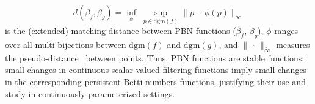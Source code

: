 \begin{equation*}\label{eq:pbn_stability}
	d(\beta_f, \beta_g) = \inf\limits_{\phi} \; \sup\limits_{p \in \mathrm{dgm}(f)} \lVert p - \phi(p) \rVert_{\widetilde{\infty} }
\end{equation*}
is the (extended) matching distance between PBN functions ($\beta_f$, $\beta_g$), $\phi$ ranges over all multi-bijections between $\mathrm{dgm}(f)$ and $\mathrm{dgm}(g)$, and $\lVert \,\cdot \, \rVert_{\widetilde{\infty}}$ measures the pseudo-distance~\cite{cerri2013betti} between points.
Thus, PBN functions are stable functions: small changes in continuous scalar-valued filtering functions imply small changes in the corresponding persistent Betti numbers functions, justifying their use and study in continuously parameterized settings. 











